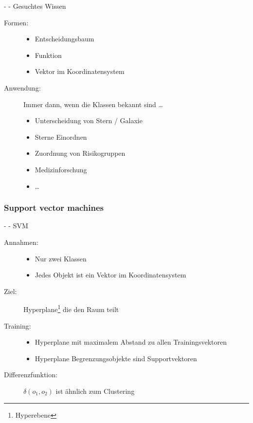 \documentclass[fleqn,11pt,aspectratio=43]{beamer}
\begin{document}
\begin{frame}{\insertsectionhead - \insertsubsectionhead - Gesuchtes Wissen \cite{ester2000knowledge}}
\begin{description}
\item[Formen:]
\begin{itemize}
\item Entscheidungsbaum %
\item Funktion %
\item Vektor im Koordinatensystem
\end{itemize}
\item[Anwendung:] Immer dann, wenn die Klassen bekannt sind \ldots
\begin{itemize}
\item Unterscheidung von Stern / Galaxie
\item Sterne Einordnen
\item Zuordnung von Risikogruppen
\item Medizinforschung
\item \dots
\end{itemize}
\end{description}
\end{frame}

\subsubsection{Support vector machines~}\label{svm}

\begin{frame}{\insertsectionhead - \insertsubsectionhead - SVM \cite{dwh}}
\begin{description}
\item[Annahmen:]
\begin{itemize}
\item Nur zwei Klassen
\item Jedes Objekt ist ein Vektor im Koordinatensystem
\end{itemize}
\item[Ziel:]  Hyperplane\footnote{Hyperebene} die den Raum teilt 
\item[Training:]
\begin{itemize}
\item Hyperplane mit maximalem Abstand zu allen Trainingsvektoren
\item Hyperplane Begrenzungsobjekte sind Supportvektoren
\end{itemize} 
\item[Differenzfunktion:] $\delta(o_1, o_2)$ ist ähnlich zum Clustering
\end{description}
\end{frame}
\end{document}
